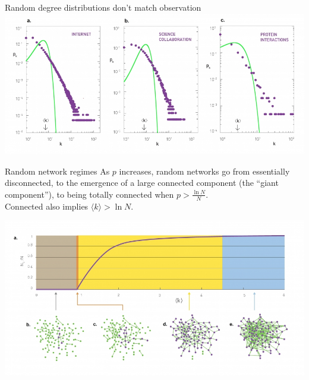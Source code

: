 \documentclass[notes]{beamer}
\begin{document}
\begin{frame}{Random degree distributions don't match observation}
  \includegraphics[width=1.1\textwidth]{Figures/poissonVsRealDegDist.jpg}
\end{frame}

\begin{frame}{Random network regimes}
  As $p$ increases, random networks go from essentially disconnected, to the
  emergence of a large connected component (the ``giant component''), to
  being totally connected when $p > \frac{\ln N}{N}$. \\[.25em]

  Connected also implies $\langle k \rangle > \ln N$. 

  \includegraphics[width=\textwidth]{Figures/randomRegimes.jpg}
\end{frame}
\end{document}
